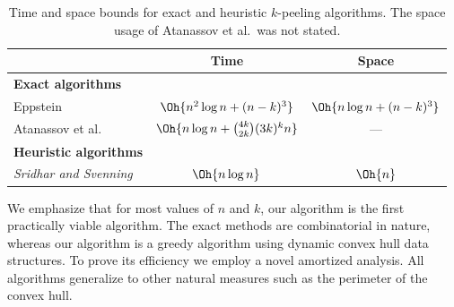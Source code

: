 \begingroup
\begin{table}[ht]
  \centering
  \setlength{\tabcolsep}{0.7em}
  \renewcommand{\arraystretch}{1.5}
  \begin{tabular}{lcc} 
    & Time & Space \\
    \hline
    \textbf{Exact algorithms} \\
    Eppstein~\cite{1992_Eppstein_k3n2, 1992_eppstein_kn3}
    & $\Oh{n^2 \log n + (n - k)^3}$
    & $\Oh{n \log n + (n - k)^3}$ \\ 
    Atanassov et al.%
    ~\cite{2009_Atanassov_exact_small_k}
    & $\Oh{n \log n + \binom{4k}{2k}(3k)^k n}$
    & --- \\[1ex]
    \textbf{Heuristic algorithms} \\
    \emph{Sridhar and Svenning~\cite{20c9233b1df84e03a3ed7cdcdc15ee42}}
    & $\Oh{n \log n}$
    & $\Oh{n}$ \\
    \hline
  \end{tabular}
    \caption{
    Time and space bounds for exact and heuristic $k$-peeling algorithms. 
    The space usage of Atanassov et al.\ was not stated.
    }
  \label{tab:k_peeling_table}
\end{table}
\endgroup

We emphasize that for most values of $n$ and $k$, our algorithm is the first practically viable algorithm. 
The exact methods are combinatorial in nature, whereas our algorithm is a greedy algorithm using dynamic convex hull data structures. 
To prove its efficiency we employ a novel amortized analysis. 
All algorithms generalize to other natural measures such as the perimeter of the convex hull. 

